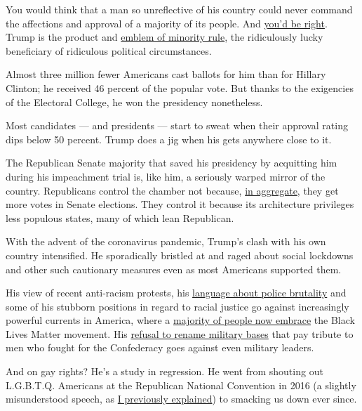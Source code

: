 You would think that a man so unreflective of his country could never
command the affections and approval of a majority of its people. And
\href{https://news.gallup.com/poll/203207/trump-job-approval-weekly.aspx}{you'd
be right}. Trump is the product and
\href{https://www.washingtonpost.com/opinions/what-unites-trumps-apologists-minority-rule/2019/11/24/152c5d06-0d6c-11ea-97ac-a7ccc8dd1ebc_story.html}{emblem
of minority rule}, the ridiculously lucky beneficiary of ridiculous
political circumstances.

Almost three million fewer Americans cast ballots for him than for
Hillary Clinton; he received 46 percent of the popular vote. But thanks
to the exigencies of the Electoral College, he won the presidency
nonetheless.

Most candidates --- and presidents --- start to sweat when their
approval rating dips below 50 percent. Trump does a jig when his gets
anywhere close to it.

The Republican Senate majority that saved his presidency by acquitting
him during his impeachment trial is, like him, a seriously warped mirror
of the country. Republicans control the chamber not because,
\href{https://www.theguardian.com/us-news/2018/nov/08/democrats-republicans-senate-majority-minority-rule}{in
aggregate}, they get more votes in Senate elections. They control it
because its architecture privileges less populous states, many of which
lean Republican.

With the advent of the coronavirus pandemic, Trump's clash with his own
country intensified. He sporadically bristled at and raged about social
lockdowns and other such cautionary measures even as most Americans
supported them.

His view of recent anti-racism protests, his
\href{https://www.vanityfair.com/news/2020/06/trump-cant-even-pretend-to-want-to-fix-police-brutality}{language
about police brutality} and some of his stubborn positions in regard to
racial justice go against increasingly powerful currents in America,
where a
\href{https://www.nytimes.com/interactive/2020/06/10/upshot/black-lives-matter-attitudes.html}{majority
of people now embrace} the Black Lives Matter movement. His
\href{https://www.politico.com/news/2020/06/10/trump-says-he-wont-consider-renaming-army-bases-breaking-with-pentagon-311271}{refusal
to rename military bases} that pay tribute to men who fought for the
Confederacy goes against even military leaders.

And on gay rights? He's a study in regression. He went from shouting out
L.G.B.T.Q. Americans at the Republican National Convention in 2016 (a
slightly misunderstood speech, as
\href{https://www.nytimes.com/2018/10/24/opinion/donald-trumps-gay-amnesia.html}{I
previously explained}) to smacking us down ever since.

